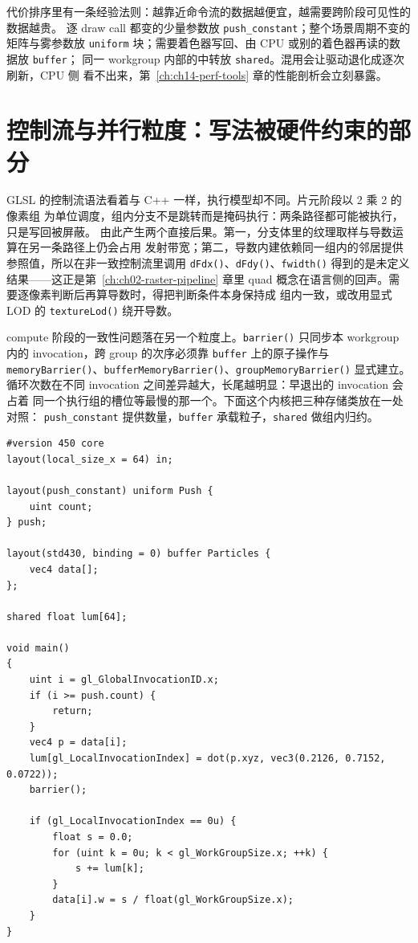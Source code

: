 \documentclass[12pt,a4paper,fontset=fandol]{ctexbook}
\newcommand{\Fn}[1]{\texttt{#1()}}
\newcommand{\Tp}[1]{\texttt{#1}}
\newcommand{\Lang}[1]{\textsf{#1}}
\newcommand{\CPP}{\Lang{C++}}
\newcommand{\DomCPU}{\Lang{CPU}}
\newcommand{\GSL}{\Lang{GLSL}}
\begin{document}
代价排序里有一条经验法则：越靠近命令流的数据越便宜，越需要跨阶段可见性的数据越贵。
逐 draw call 都变的少量参数放 \Tp{push\_constant}；整个场景周期不变的矩阵与雾参数放
\Tp{uniform} 块；需要着色器写回、由 CPU 或别的着色器再读的数据放 \Tp{buffer}；
同一 workgroup 内部的中转放 \Tp{shared}。混用会让驱动退化成逐次刷新，\DomCPU{} 侧
看不出来，第~\ref{ch:ch14-perf-tools} 章的性能剖析会立刻暴露。

\section{控制流与并行粒度：写法被硬件约束的部分}

\GSL{} 的控制流语法看着与 \CPP{} 一样，执行模型却不同。片元阶段以 2 乘 2 的像素组
为单位调度，组内分支不是跳转而是掩码执行：两条路径都可能被执行，只是写回被屏蔽。
由此产生两个直接后果。第一，分支体里的纹理取样与导数运算在另一条路径上仍会占用
发射带宽；第二，导数内建依赖同一组内的邻居提供参照值，所以在非一致控制流里调用
\Fn{dFdx}、\Fn{dFdy}、\Fn{fwidth} 得到的是未定义结果——这正是第~\ref{ch:ch02-raster-pipeline}
章里 quad 概念在语言侧的回声。需要逐像素判断后再算导数时，得把判断条件本身保持成
组内一致，或改用显式 LOD 的 \Fn{textureLod} 绕开导数。

compute 阶段的一致性问题落在另一个粒度上。\Fn{barrier} 只同步本 workgroup 内的
invocation，跨 group 的次序必须靠 \Tp{buffer} 上的原子操作与
\Fn{memoryBarrier}、\Fn{bufferMemoryBarrier}、\Fn{groupMemoryBarrier} 显式建立。
循环次数在不同 invocation 之间差异越大，长尾越明显：早退出的 invocation 会占着
同一个执行组的槽位等最慢的那一个。下面这个内核把三种存储类放在一处对照：
\Tp{push\_constant} 提供数量，\Tp{buffer} 承载粒子，\Tp{shared} 做组内归约。

\begin{lstlisting}[style=glslstyle,caption={计算着色器：push constant 读入数量，SSBO 读写数据，shared 做 workgroup 内归约},label={lst:ch05-compute}]
#version 450 core
layout(local_size_x = 64) in;

layout(push_constant) uniform Push {
    uint count;
} push;

layout(std430, binding = 0) buffer Particles {
    vec4 data[];
};

shared float lum[64];

void main()
{
    uint i = gl_GlobalInvocationID.x;
    if (i >= push.count) {
        return;
    }
    vec4 p = data[i];
    lum[gl_LocalInvocationIndex] = dot(p.xyz, vec3(0.2126, 0.7152, 0.0722));
    barrier();

    if (gl_LocalInvocationIndex == 0u) {
        float s = 0.0;
        for (uint k = 0u; k < gl_WorkGroupSize.x; ++k) {
            s += lum[k];
        }
        data[i].w = s / float(gl_WorkGroupSize.x);
    }
}
\end{lstlisting}
\end{document}
